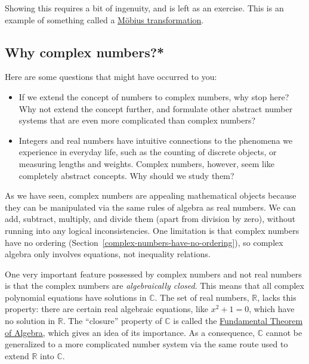 \documentclass[10pt,a4paper]{article}
\begin{document}
\noindent
Showing this requires a bit of ingenuity, and is left as an
exercise. This is an example of something called a
\href{http://en.wikipedia.org/wiki/M\%C3\%B6bius_transformation}{Möbius
  transformation}.

\subsection{Why complex numbers?*}\label{why-complex-numbers}

Here are some questions that might have occurred to you:

\begin{itemize}
\item
  If we extend the concept of numbers to complex numbers, why stop here?
  Why not extend the concept further, and formulate other abstract
  number systems that are even more complicated than complex numbers?
\item
  Integers and real numbers have intuitive connections to the phenomena
  we experience in everyday life, such as the counting of discrete
  objects, or measuring lengths and weights. Complex numbers, however,
  seem like completely abstract concepts. Why should we study them?
\end{itemize}

As we have seen, complex numbers are appealing mathematical objects
because they can be manipulated via the same rules of algebra as real
numbers. We can add, subtract, multiply, and divide them (apart from
division by zero), without running into any logical
inconsistencies. One limitation is that complex numbers have no
ordering (Section~\ref{complex-numbers-have-no-ordering}), so complex
algebra only involves equations, not inequality relations.

One very important feature possessed by complex numbers and not real
numbers is that the complex numbers are \emph{algebraically closed}.
This means that all complex polynomial equations have solutions in
$\mathbb{C}$. The set of real numbers, $\mathbb{R}$, lacks this
property: there are certain real algebraic equations, like
$x^2 + 1 = 0$, which have no solution in $\mathbb{R}$. The
``closure'' property of $\mathbb{C}$ is called the
\href{https://en.wikipedia.org/wiki/Fundamental_theorem_of_algebra}{Fundamental
Theorem of Algebra}, which gives an idea of its importance. As a
consequence, $\mathbb{C}$ cannot be generalized to a more complicated
number system via the same route used to extend $\mathbb{R}$ into
$\mathbb{C}$.
\end{document}
